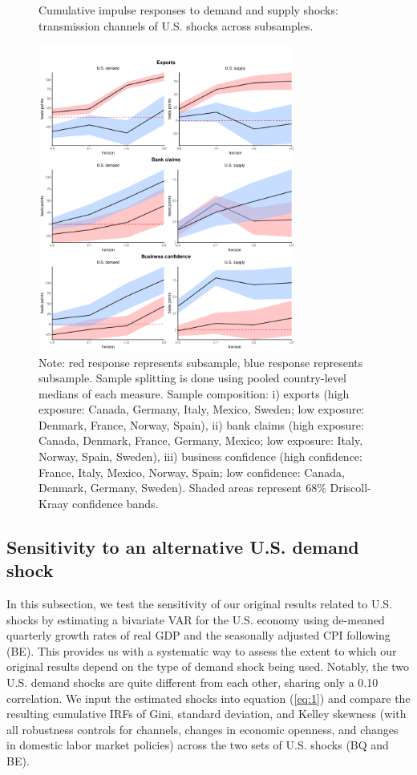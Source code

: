 \documentclass[12pt, a4paper]{article}
\begin{document}
\begin{figure}[H]
    \centering    
    \caption{Cumulative impulse responses to demand and supply shocks: transmission channels of U.S. shocks across subsamples.}    
    \label{fig:demand_supply_channels}
    \includegraphics[width=0.75\textwidth]{Figures/high_low_LP_channels_US.pdf}
   \centering \caption*{Note: red response represents  subsample, blue response represents  subsample. Sample splitting is done using pooled country-level medians of each measure. Sample composition: i) exports (high exposure: Canada, Germany, Italy, Mexico, Sweden; low exposure: Denmark, France, Norway, Spain), ii) bank claims (high exposure: Canada, Denmark, France, Germany, Mexico; low exposure: Italy, Norway, Spain, Sweden), iii) business confidence (high confidence: France, Italy, Mexico, Norway, Spain; low confidence: Canada, Denmark, Germany, Sweden). Shaded areas represent 68\% Driscoll-Kraay confidence bands.}
\end{figure}

\subsection{Sensitivity to an alternative U.S. demand shock}
\label{section:sensitivity}
In this subsection, we test the sensitivity of our original results related to U.S. shocks by estimating a bivariate VAR for the U.S. economy using de-meaned quarterly growth rates of real GDP and the seasonally adjusted CPI following \textcite{bayoumi1992shocking} (BE). This provides us with a systematic way to assess the extent to which our original results depend on the type of demand shock being used. Notably, the two U.S. demand shocks are quite different from each other, sharing only a 0.10 correlation. We input the estimated shocks into equation (\ref{eq:1}) and compare the resulting cumulative IRFs of Gini, standard deviation, and Kelley skewness (with all robustness controls for channels, changes in economic openness, and changes in domestic labor market policies) across the two sets of U.S. shocks (BQ and BE).
\end{document}
